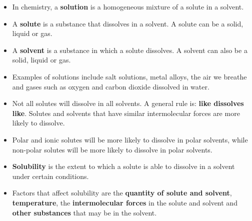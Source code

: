 
\begin{itemize}
\item{In chemistry, a \textbf{solution} is a homogeneous mixture of a solute in a solvent.}
\item{A \textbf{solute} is a substance that dissolves in a solvent. A solute can be a solid, liquid or gas.}
\item{A \textbf{solvent} is a substance in which a solute dissolves. A solvent can also be a solid, liquid or gas.}
\item{Examples of solutions include salt solutions, metal alloys, the air we breathe and gases such as oxygen and carbon dioxide dissolved in water.}
\item{Not all solutes will dissolve in all solvents. A general rule is: \textbf{like dissolves like}. Solutes and solvents that have similar intermolecular forces are more likely to dissolve.}
\item{Polar and ionic solutes will be more likely to dissolve in polar solvents, while non-polar solutes will be more likely to dissolve in polar solvents.}
\item{\textbf{Solubility} is the extent to which a solute is able to dissolve in a solvent under certain conditions.}
\item{Factors that affect solubility are the \textbf{quantity of solute and solvent}, \textbf{temperature}, the \textbf{intermolecular forces} in the solute and solvent and \textbf{other substances} that may be in the solvent.}
\end{itemize}


